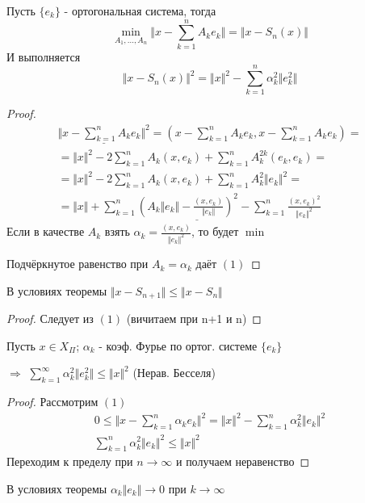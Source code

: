\documentclass{article}
\theoremstyle{definition}
\numberwithin{theorem}{section}
\numberwithin{lemma}{section}
\numberwithin{definition}{section}
\numberwithin{corollary}{section}
\numberwithin{equation}{section}
\let\implies\Rightarrow
\begin{document}
\begin{theorem}
  Пусть $\{e_k\}$ - ортогональная система, тогда
  \[
    \min_{A_1,\dots ,A_n}\Vert x- \sum_{k=1}^{n}A_ke_k \Vert=\Vert x- S_n(x) \Vert
  \]
  И выполняется
  \[
    \Vert x-S_n(x) \Vert^{2}=\Vert x \Vert^{2}-\sum_{k=1}^{n}\alpha_k^{2}\Vert e_k^{2} \Vert \tag{1}
  \]
\end{theorem}
\begin{proof}
  \begin{gather*}
    \underline{\Vert x-\sum_{k=1}^{n}A_ke_k \Vert^{2}}=(x-\sum_{k=1}^{n}A_ke_k,x-\sum_{k=1}^{n}A_ke_k) = \\ 
    = \Vert x \Vert^{2}-2\sum_{k=1}^{n}A_k(x,e_k) + \sum_{k=1}^{n}A_k^{2k}(e_k,e_k)= \\ 
    = \Vert x \Vert^{2}-2\sum_{k=1}^{n}A_k(x,e_k)+\sum_{k=1}^{n}A_k^{2}\Vert e_k \Vert^{2}= \\ 
    = \underline{\Vert x \Vert + \sum_{k=1}^{n}(A_k\Vert e_k \Vert-\frac{(x,e_k)}{\Vert e_k \Vert})^{2} - \sum_{k=1}^{n}\frac{(x,e_k)^{2}}{\Vert e_k \Vert^{2}}}
  \end{gather*}
  Если в качестве $A_k$ взять $\alpha_k=\frac{(x,e_k)}{\Vert e_k \Vert^{2}}$, то будет $\min$

  Подчёркнутое равенство при $A_k=\alpha_k$ даёт $(1)$
\end{proof}
\begin{corollary}
  В условиях теоремы $\Vert x-S_{n+1} \Vert \le \Vert x-S_n \Vert$
\end{corollary}
\begin{proof}
  Следует из $(1)$ (вичитаем при n+1 и n)
\end{proof}
\begin{theorem}[Т3]
  Пусть $x\in X_\Pi$; $\alpha_k$ - коэф. Фурье по ортог. системе $\{e_k\}$
  
  $\implies$ $\sum_{k=1}^{\infty}\alpha_k^{2}\Vert e_k^{2} \Vert \le \Vert x \Vert^{2}$ (Нерав. Бесселя)
\end{theorem}
\begin{proof}
  Рассмотрим $(1)$
  \begin{gather*}
    0 \le \Vert x-\sum_{k=1}^{n}\alpha_ke_k \Vert^{2}=\Vert x \Vert^{2}-\sum_{k=1}^{n}\alpha_k^{2}\Vert e_k \Vert^{2} \\ 
    \sum_{k=1}^{n}\alpha_k^{2}\Vert e_k \Vert^{2} \le \Vert x \Vert^{2}
  \end{gather*}
  Переходим к пределу при $n\to\infty$ и получаем неравенство
\end{proof}
\begin{corollary}
  В условиях теоремы $\alpha_k\Vert e_k \Vert{\to}0$ при $k\to\infty$
\end{corollary}
\end{document}
